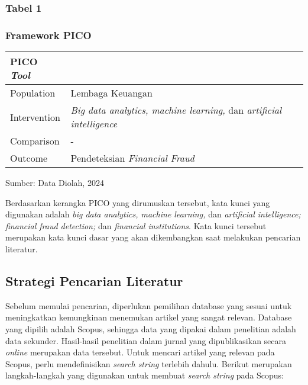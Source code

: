 \documentclass[12pt, a4paper]{article}
\begin{document}
\begin{center}
    \renewcommand{\arraystretch}{1.5} %
    \subsubsection*{Tabel 1}
    \subsubsection*{Framework PICO}
    \begin{longtable}{|l|l|}
        \hline
        \textbf{PICO \textit{Tool}} & \\ \hline
        Population         & Lembaga Keuangan \\ \hline
        Intervention       & \textit{Big data analytics, machine learning,} dan \textit{artificial intelligence} \\ \hline
        Comparison         & - \\ \hline
        Outcome            & Pendeteksian \textit{Financial Fraud} \\ \hline
    \end{longtable}
\end{center}

\begin{flushleft}
Sumber: Data Diolah, 2024
\end{flushleft}

Berdasarkan kerangka PICO yang dirumuskan tersebut, kata kunci yang digunakan adalah \textit{big data analytics, machine learning,} 
dan \textit{artificial intelligence; financial fraud detection;} dan \textit{financial institutions}.
Kata kunci tersebut merupakan kata kunci dasar yang akan dikembangkan saat melakukan pencarian literatur.

\subsection*{Strategi Pencarian Literatur}
\hspace{1cm}Sebelum memulai pencarian, diperlukan pemilihan database yang sesuai untuk meningkatkan kemungkinan menemukan artikel
yang sangat relevan. Database yang dipilih adalah Scopus, sehingga data yang dipakai dalam penelitian adalah data sekunder.
Hasil-hasil penelitian dalam jurnal yang dipublikasikan secara \textit{online} merupakan data tersebut.
Untuk mencari artikel yang relevan pada Scopus, perlu mendefinisikan \textit{search string} terlebih dahulu.
Berikut merupakan langkah-langkah yang digunakan untuk membuat \textit{search string} pada Scopus:
\end{document}
